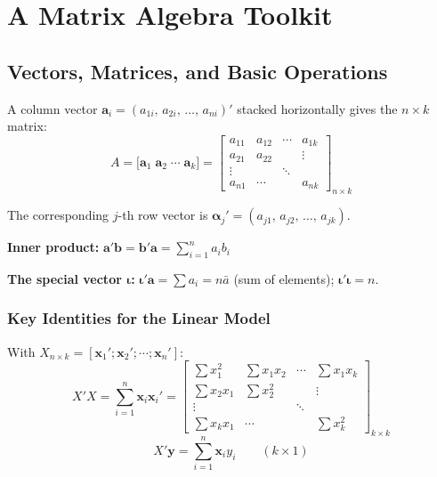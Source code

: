 
\chapter{A Matrix Algebra Toolkit}
\label{chap_Matrix}

\section{Vectors, Matrices, and Basic Operations}
\label{sec_VecMat}

A column vector $\mathbf{a}_i = (a_{1i},\, a_{2i},\, \ldots,\, a_{ni})'$
stacked horizontally gives the $n \times k$ matrix:
\begin{equation}
  A = \bigl[\mathbf{a}_1\;\mathbf{a}_2\;\cdots\;\mathbf{a}_k\bigr]
  = \begin{bmatrix}
      a_{11} & a_{12} & \cdots & a_{1k} \\
      a_{21} & a_{22} &        & \vdots \\
      \vdots &        & \ddots &        \\
      a_{n1} & \cdots &        & a_{nk}
    \end{bmatrix}_{n \times k}
\end{equation}

The corresponding $j$-th row vector is $\boldsymbol{\alpha}_j' =
(a_{j1},\, a_{j2},\, \ldots,\, a_{jk})$.

\noindent\textbf{Inner product:}
$\mathbf{a}'\mathbf{b} = \mathbf{b}'\mathbf{a} =
\sum_{i=1}^{n} a_i b_i$

\noindent\textbf{The special vector $\boldsymbol{\iota}$:}
$\boldsymbol{\iota}'\mathbf{a} = \sum a_i = n\bar{a}$ (sum of elements);
$\boldsymbol{\iota}'\boldsymbol{\iota} = n$.

\subsection{Key Identities for the Linear Model}

With $X_{n \times k} = [\mathbf{x}_1';\mathbf{x}_2';\cdots;\mathbf{x}_n']$:
\begin{equation}
  X'X = \sum_{i=1}^{n}\mathbf{x}_i\mathbf{x}_i'
  = \begin{bmatrix}
      \sum x_1^2   & \sum x_1 x_2 & \cdots & \sum x_1 x_k \\
      \sum x_2 x_1 & \sum x_2^2   &        & \vdots        \\
      \vdots       &              & \ddots &               \\
      \sum x_k x_1 & \cdots       &        & \sum x_k^2
    \end{bmatrix}_{k \times k}
\end{equation}
\begin{equation}
  X'\mathbf{y} = \sum_{i=1}^{n}\mathbf{x}_i y_i \qquad (k \times 1)
\end{equation}


